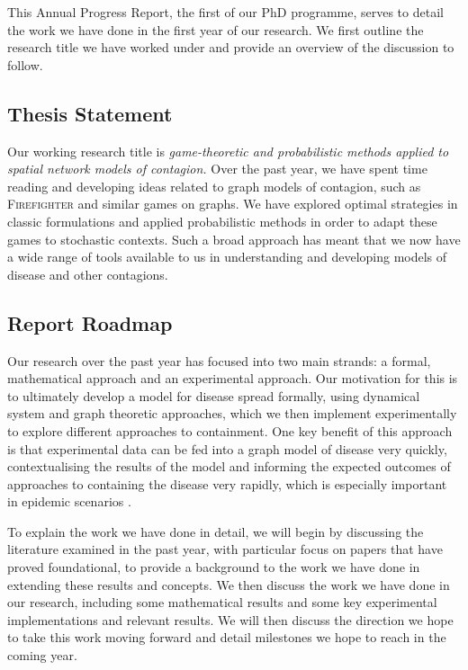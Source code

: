 \documentclass[../report.tex]{subfiles}
\begin{document}
This Annual Progress Report, the first of our PhD programme, serves to detail the work we have done in the first year of our research. We first outline the research title we have worked under and provide an overview of the discussion to follow.

\subsection{Thesis Statement}

Our working research title is {\it game-theoretic and probabilistic methods applied to spatial network models of contagion.} Over the past year, we have spent time reading and developing ideas related to graph models of contagion, such as {\scshape Firefighter} and similar games on graphs. We have explored optimal strategies in classic formulations and applied probabilistic methods in order to adapt these games to stochastic contexts. Such a broad approach has meant that we now have a wide range of tools available to us in understanding and developing models of disease and other contagions.

\subsection{Report Roadmap}

Our research over the past year has focused into two main strands: a formal, mathematical approach and an experimental approach. Our motivation for this is to ultimately develop a model for disease spread formally, using dynamical system and graph theoretic approaches, which we then implement experimentally to explore different approaches to containment. One key benefit of this approach is that experimental data can be fed into a graph model of disease very quickly, contextualising the results of the model and informing the expected outcomes of approaches to containing the disease very rapidly, which is especially important in epidemic scenarios \cite{firestone_2019}. 

To explain the work we have done in detail, we will begin by discussing the literature examined in the past year, with particular focus on papers that have proved foundational, to provide a background to the work we have done in extending these results and concepts. We then discuss the work we have done in our research, including some mathematical results and some key experimental implementations and relevant results. We will then discuss the direction we hope to take this work moving forward and detail milestones we hope to reach in the coming year.
\end{document}
